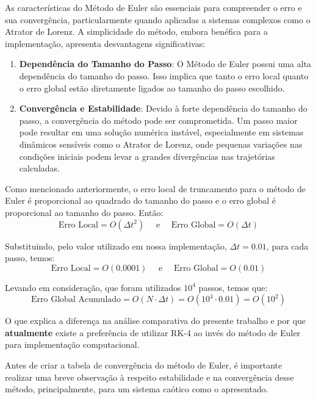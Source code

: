 \documentclass[12pt, a4paper]{article}
\begin{document}
As características do Método de Euler são essenciais para compreender o erro e sua convergência, particularmente quando aplicadas a sistemas complexos como o Atrator de Lorenz. A simplicidade do método, embora benéfica para a implementação, apresenta desvantagens significativas:

\begin{enumerate}
    \item \textbf{Dependência do Tamanho do Passo}: O Método de Euler possui uma alta dependência do tamanho do passo. Isso implica que tanto o erro local quanto o erro global estão diretamente ligados ao tamanho do passo escolhido.

    \item \textbf{Convergência e Estabilidade}: Devido à forte dependência do tamanho do passo, a convergência do método pode ser comprometida. Um passo maior pode resultar em uma solução numérica instável, especialmente em sistemas dinâmicos sensíveis como o Atrator de Lorenz, onde pequenas variações nas condições iniciais podem levar a grandes divergências nas trajetórias calculadas.
\end{enumerate}

Como mencionado anteriormente, o erro local de truncamento para o método de Euler é proporcional ao quadrado do tamanho do passo e o erro global é proporcional ao tamanho do passo. Então:
\begin{equation*}
    \text{Erro Local} = O(\Delta t^2) \quad \text{ e } \quad \text{Erro Global} = O(\Delta t) 
\end{equation*}

Substituindo, pelo valor utilizado em nossa implementação, $\Delta t = 0.01$, para cada passo, temos:
\begin{equation*}
    \text{Erro Local} = O(0.0001) \quad \text{ e } \quad \text{Erro Global} = O(0.01) 
\end{equation*}

Levando em consideração, que foram utilizados $10^4$ passos, temos que:
\begin{equation*}
    \text{Erro Global Acumulado} = O(N \cdot \Delta t) = O(10^4 \cdot 0.01) = O(10^2)
\end{equation*}

O que explica a diferença na análise comparativa do presente trabalho e por que \textbf{atualmente} existe a preferência de utilizar RK-4 ao invés do método de Euler para implementação computacional. 

Antes de criar a tabela de convergência do método de Euler, é importante realizar uma breve observação à respeito estabilidade e na convergência desse método, principalmente, para um sistema caótico como o apresentado.
\end{document}
